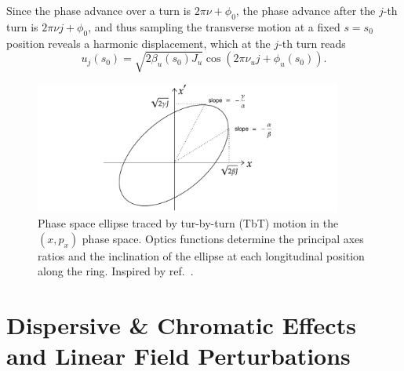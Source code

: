  Since the phase advance over a turn is $2\pi \nu+\phi_0$, the phase advance after the $j$-th turn is $2\pi\nu j+\phi_0$, and thus
 sampling the transverse motion at a fixed $s=s_0$ position reveals a harmonic displacement, which at the $j$-th turn reads
\begin{equation}
    u_j(s_0)=\sqrt{2\beta_u(s_0) J_u}\cos(2\pi\nu_u j+\phi_u(s_0)).
    \label{eq:TbT_motion}
\end{equation}
\begin{figure}[htb]
    \centering
    \includegraphics[width=0.9\textwidth]{Images/ellipse.pdf}
    \caption{Phase space ellipse traced by tur-by-turn (TbT) motion in the $(x,p_x)$ phase space. Optics functions determine the principal axes ratios and the inclination of the ellipse at each longitudinal position along the ring. Inspired by ref.~\cite{wolski_beam_2014}.}
    \label{ellipse}
\end{figure}
\section{Dispersive \& Chromatic Effects and Linear Field Perturbations}
